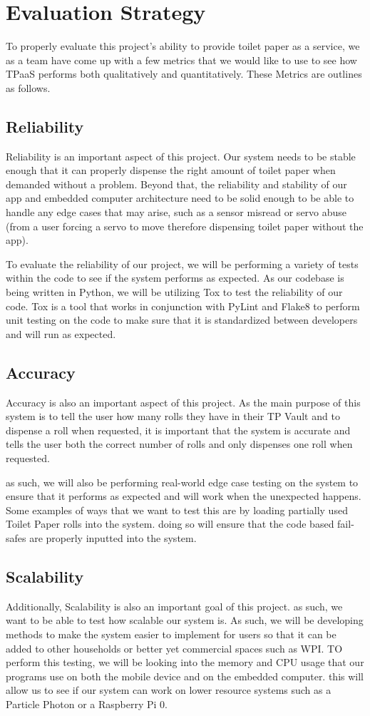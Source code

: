 \section{Evaluation Strategy}
To properly evaluate this project's ability to provide toilet paper as a service, we as a team have come up with a few metrics that we would like to use to see how TPaaS performs both qualitatively and quantitatively. These Metrics are outlines as follows.
\subsection{Reliability}
Reliability is an important aspect of this project. Our system needs to be stable enough that it can properly dispense the right amount of toilet paper when demanded without a problem. Beyond that, the reliability and stability of our app and embedded computer architecture need to be solid enough to be able to handle any edge cases that may arise, such as a sensor misread or servo abuse (from a user forcing a servo to move therefore dispensing toilet paper without the app).

To evaluate the reliability of our project, we will be performing a variety of tests within the code to see if the system performs as expected. As our codebase is being written in Python\cite{python}, we will be utilizing Tox\cite{tox} to test the reliability of our code. Tox is a tool that works in conjunction with PyLint\cite{pylint} and Flake8\cite{flake8} to perform unit testing on the code to make sure that it is standardized between developers and will run as expected. 

\subsection{Accuracy}
Accuracy is also an important aspect of this project. As the main purpose of this system is to tell the user how many rolls they have in their TP Vault and to dispense a roll when requested, it is important that the system is accurate and tells the user both the correct number of rolls and only dispenses one roll when requested.

as such, we will also be performing real-world edge case testing on the system to ensure that it performs as expected and will work when the unexpected happens. Some examples of ways that we want to test this are by loading partially used Toilet Paper rolls into the system. doing so will ensure that the code based fail-safes are properly inputted into the system. 
\subsection{Scalability}
Additionally, Scalability is also an important goal of this project. as such, we want to be able to test how scalable our system is. As such, we will be developing methods to make the system easier to implement for users so that it can be added to other households or better yet commercial spaces such as WPI. 
TO perform this testing, we will be looking into the memory and CPU usage that our programs use on both the mobile device and on the embedded computer. this will allow us to see if our system can work on lower resource systems such as a Particle Photon or a Raspberry Pi 0.

